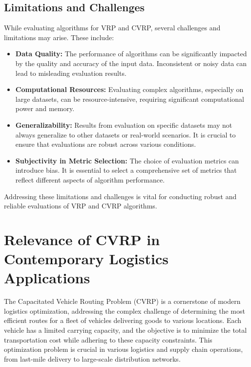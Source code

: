 \documentclass{article}
\begin{document}
    \subsection{Limitations and Challenges}\label{subsec:limitations-and-challenges}
    While evaluating algorithms for VRP and CVRP, several challenges and limitations may arise. These include:
    \begin{itemize}
        \item \textbf{Data Quality:} The performance of algorithms can be significantly impacted by the quality and accuracy of the input data. Inconsistent or noisy data can lead to misleading evaluation results.
        \item \textbf{Computational Resources:} Evaluating complex algorithms, especially on large datasets, can be resource-intensive, requiring significant computational power and memory.
        \item \textbf{Generalizability:} Results from evaluation on specific datasets may not always generalize to other datasets or real-world scenarios. It is crucial to ensure that evaluations are robust across various conditions.
        \item \textbf{Subjectivity in Metric Selection:} The choice of evaluation metrics can introduce bias. It is essential to select a comprehensive set of metrics that reflect different aspects of algorithm performance.
    \end{itemize}
    Addressing these limitations and challenges is vital for conducting robust and reliable evaluations of VRP and CVRP algorithms. \cite{toth2014vehicle}

    \newpage


    \section{Relevance of CVRP in Contemporary Logistics Applications}\label{sec:relevance-of-cvrp-in-contemporary-logistics-applications}

    The Capacitated Vehicle Routing Problem (CVRP) is a cornerstone of modern logistics optimization, addressing the complex challenge of determining the most efficient routes for a fleet of vehicles delivering goods to various locations. Each vehicle has a limited carrying capacity, and the objective is to minimize the total transportation cost while adhering to these capacity constraints. This optimization problem is crucial in various logistics and supply chain operations, from last-mile delivery to large-scale distribution networks.
\end{document}
